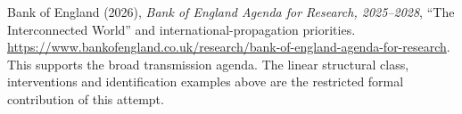 \documentclass[11pt,a4paper]{article}
\theoremstyle{definition}
\theoremstyle{remark}
\begin{document}
Bank of England (2026), \emph{Bank of England Agenda for Research, 2025--2028}, ``The Interconnected World'' and international-propagation priorities. \url{https://www.bankofengland.co.uk/research/bank-of-england-agenda-for-research}. This supports the broad transmission agenda. The linear structural class, interventions and identification examples above are the restricted formal contribution of this attempt.
\end{document}
